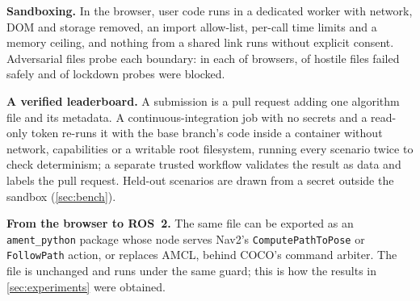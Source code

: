 \textbf{Sandboxing.} In the browser, user code runs in a dedicated worker with network, DOM and
storage removed, an import allow-list, per-call time limits and a memory ceiling, and nothing
from a shared link runs without explicit consent. Adversarial files probe each boundary: in
each of \EscapeBrowsers{} browsers, \EscapeCasesSafe{} of \EscapeCases{} hostile files failed
safely and \EscapeProbesBlocked{} of \EscapeProbes{} lockdown probes were blocked.

\textbf{A verified leaderboard.} A submission is a pull request adding one algorithm file and
its metadata. A continuous-integration job with no secrets and a read-only token re-runs it with
the base branch's code inside a container without network, capabilities or a writable root
filesystem, running every scenario twice to check determinism; a separate trusted workflow
validates the result as data and labels the pull request. Held-out scenarios are drawn from a
secret outside the sandbox (\cref{sec:bench}).

\textbf{From the browser to ROS~2.} The same file can be exported as an \texttt{ament\_python}
package whose node serves Nav2's \texttt{ComputePathToPose} or \texttt{FollowPath} action, or
replaces AMCL, behind COCO's command arbiter. The file is unchanged and runs under the same
guard; this is how the  results in \cref{sec:experiments} were obtained.
